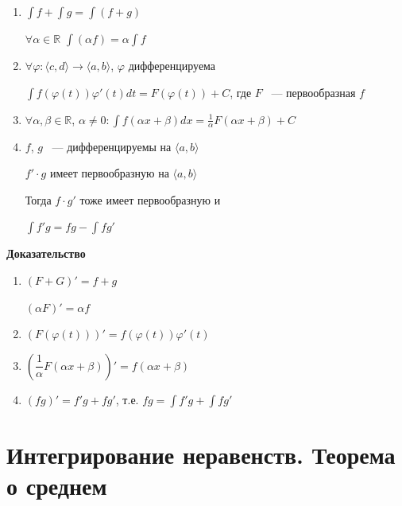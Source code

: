 \documentclass{article}
\begin{document}
		\begin{enumerate}
		
			\item $\int f + \int g  = \int (f + g)$
			
				$\forall \alpha \in \mathbb{R}$ $\int(\alpha f) = \alpha \int{f}$
				
			\item $\forall \varphi: \langle c, d \rangle \rightarrow \langle a, b \rangle$, $\varphi$ дифференцируема
			
				$\int f(\varphi(t))\varphi'(t)dt = F(\varphi(t)) + C$, где $F$ ~--- первообразная $f$
				
			\item $\forall \alpha, \beta \in \mathbb{R}$, $\alpha \neq 0 : \int f(\alpha x + \beta)dx = \frac{1}{\alpha} F(\alpha x + \beta) + C$
			
			\item $f$, $g$ ~--- дифференцируемы на $\langle a, b \rangle$
			
				$f' \cdot g$ имеет первообразную на $\langle a, b \rangle$
				
				Тогда $f \cdot g'$ тоже имеет первообразную и 
				
				$\int f'g = fg - \int fg'$
				
		\end{enumerate}
			
		\textbf{Доказательство}
		
		\begin{enumerate}
		
			\item $(F + G)' = f + g$
			
				$(\alpha F)' = \alpha f$
				
			\item $(F(\varphi(t)))' = f(\varphi(t))\varphi'(t)$
			
			\item $\left(\dfrac{1}{\alpha} F (\alpha x + \beta)\right)' = f(\alpha x + \beta)$
			
			\item $(fg)' = f'g + fg'$, т.е. $fg = \int f'g + \int fg'$
			
		\end{enumerate}
		
	\newpage
	
	\section{Интегрирование неравенств. Теорема о среднем}
	
\end{document}
